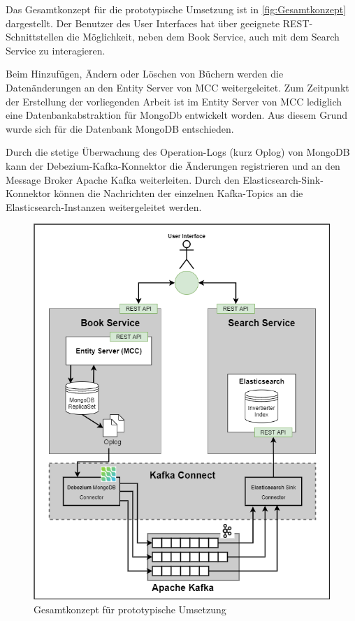 Das Gesamtkonzept für die prototypische Umsetzung ist in \autoref{fig:Gesamtkonzept} dargestellt. Der Benutzer des User Interfaces hat über geeignete REST-Schnittstellen die Möglichkeit, neben dem Book Service, auch mit dem Search Service zu interagieren.

Beim Hinzufügen, Ändern oder Löschen von Büchern werden die Datenänderungen an den Entity Server von MCC weitergeleitet. Zum Zeitpunkt der Erstellung der vorliegenden Arbeit ist im Entity Server von MCC lediglich eine Datenbankabstraktion für MongoDb entwickelt worden. Aus diesem Grund wurde sich für die Datenbank MongoDB entschieden.

Durch die stetige Überwachung des Operation-Logs (kurz Oplog) von MongoDB kann der Debezium-Kafka-Konnektor die Änderungen registrieren und an den Message Broker \glqq Apache Kafka\grqq{} weiterleiten. Durch den Elasticsearch-Sink-Konnektor können die Nachrichten der einzelnen Kafka-Topics an die Elasticsearch-Instanzen weitergeleitet werden.

\begin{figure}[H]
    \centering
    \includegraphics[width=0.9\linewidth]{images/Gesamtkonzept.png}
    \caption{Gesamtkonzept für prototypische Umsetzung}
    \label{fig:Gesamtkonzept}
\end{figure}